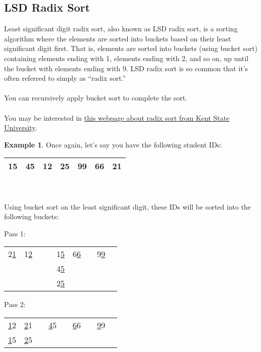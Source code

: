 \documentclass[]{article}
\theoremstyle{definition}
\newtheorem{ex}{Example}[section]
\begin{document}
				\subsection{LSD Radix Sort}
					Least significant digit radix sort, also known as LSD radix sort, is a sorting algorithm where the elements are sorted into buckets based on their least significant digit first. That is, elements are sorted into buckets (using bucket sort) containing elements ending with 1, elements ending with 2, and so on, up until the bucket with elements ending with 9. LSD radix sort is so common that it's often referred to simply as ``radix sort.''
					\\ \\
					You can recursively apply bucket sort to complete the sort.
					\\ \\
					You may be interested in \href{http://www.personal.kent.edu/~rmuhamma/Algorithms/MyAlgorithms/Sorting/radixSort.htm}{this webpage about radix sort from Kent State University}.
					\begin{ex}
						Once again, let's say you have the following student IDs: \begin{tabular}{|c|c|c|c|c|c|c|} \hline 15 & 45 & 12 & 25 & 99 & 66 & 21 \\ \hline \end{tabular}
						\\ \\
						Using bucket sort on the least significant digit, these IDs will be sorted into the following buckets: \\
						\begin{center}
							Pass 1: \begin{tabular}{|c|c|c|c|c|c|c|c|c|}
									\hline
									2\underline{1} & 1\underline{2} & & & 1\underline{5} & 6\underline{6} & & 9\underline{9} \\
									& & & & 4\underline{5} & & & \\
									& & & & 2\underline{5} & & & \\ \hline
								\end{tabular}

							Pass 2: \begin{tabular}{|c|c|c|c|c|c|c|c|c|}
									\hline
									\underline{1}2 & \underline{2}1 & & \underline{4}5 & & \underline{6}6 & & \underline{9}9 \\
									\underline{1}5 & \underline{2}5 & & & & & & \\ \hline
								\end{tabular}
						\end{center}
					\end{ex}
\end{document}
